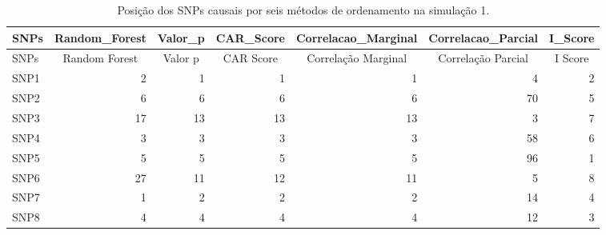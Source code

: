 \begin{table}[H]
\centering
\begin{tabular}{lrrrrrr}
  \hline
SNPs & Random\_Forest & Valor\_p & CAR\_Score & Correlacao\_Marginal & Correlacao\_Parcial & I\_Score \\ 
  \hline
 SNPs & \multicolumn{1}{c}{Random Forest} & \multicolumn{1}{c}{Valor p} & \multicolumn{1}{c}{CAR Score} & \multicolumn{1}{c}{Correlação Marginal} & \multicolumn{1}{c}{Correlação Parcial} & \multicolumn{1}{c}{I Score} \\ \hline
 \hline
SNP1 &   2 &   1 &   1 &   1 &   4 &   2 \\ 
  SNP2 &   6 &   6 &   6 &   6 &  70 &   5 \\ 
  SNP3 &  17 &  13 &  13 &  13 &   3 &   7 \\ 
  SNP4 &   3 &   3 &   3 &   3 &  58 &   6 \\ 
  SNP5 &   5 &   5 &   5 &   5 &  96 &   1 \\ 
  SNP6 &  27 &  11 &  12 &  11 &   5 &   8 \\ 
  SNP7 &   1 &   2 &   2 &   2 &  14 &   4 \\ 
  SNP8 &   4 &   4 &   4 &   4 &  12 &   3 \\ 
   \hline
\end{tabular}
\caption{Posição dos SNPs causais por seis métodos de ordenamento na simulação 1.} 
\label{tab:positions_causais}
\end{table}

